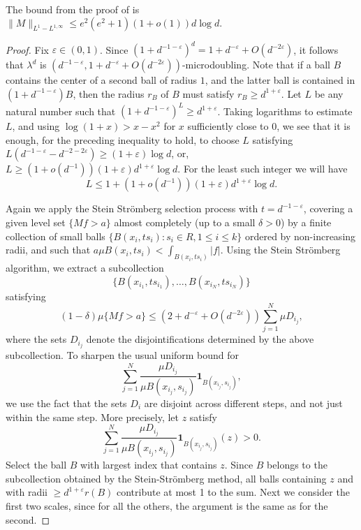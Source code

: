 \documentclass[12pt]{amsart}
\theoremstyle{definition}
\theoremstyle{parrafo}
\begin{document}
 The bound from the proof of \cite[Theorem 1]{StSt} is 
 $\|M\|_{L^1-L^{1,\infty}} \le  e^2 (e^2 + 1) (1 + o(1)) d \log d.$

 \begin{proof} Fix $\varepsilon \in (0,1)$.  Since $(1 + d^{-1 - \varepsilon})^d = 1 + d^{ - \varepsilon}
 + O(d^{ -2  \varepsilon})$, it follows that $\lambda^d$ is $(d^{-1  - \varepsilon},  1 + d^{ - \varepsilon}
 + O(d^{ -2  \varepsilon}))$-microdoubling. Note that if a ball $B$ contains the center of a second  ball of
 radius $1$, and the latter ball is contained in $(1 + d^{-1 - \varepsilon}) B$, then the radius $r_B$
 of $B$ must satisfy $r_B \ge  d^{ 1 +  \varepsilon}$. Let  $L$ be any natural number such that 
 $(1 + d^{-1 - \varepsilon})^L \ge  d^{1 +  \varepsilon}$. Taking logarithms
 to estimate $L$, 
 and using $\log(1 + x) > x - x^2$ for $x$ sufficiently close to $0$, we see that it is
 enough, for the preceding inequality to hold,  to choose $L$ satisfying $L (d^{-1 - \varepsilon} - d^{-2 - 2\varepsilon})
 \ge (1 + \varepsilon) \log d$, or, $L \ge (1 + o(d^{-1}))(1 + \varepsilon) d^{1 + \varepsilon} \log d$.  
For the least such integer we will have 
$$
L \le 1 + (1 + o(d^{-1}))(1 + \varepsilon) d^{1 + \varepsilon} \log d.
$$

 Again we  apply the
 Stein Str\"omberg selection process  with $t = d^{-1 - \varepsilon}$,  
  covering a given  level set  $\{M f > a\}$  almost completely (up to a small $\delta > 0$) by a finite collection of  small balls
 $\{B(x_i, t s_i): s_i \in R, 1 \le i \le k\}$  ordered by non-increasing radii,
 and such that $a \mu B(x_i, t s_i) < \int_{B(x_i, t s_i)} |f|$.
 Using the Stein Str\"omberg algorithm,  we extract a subcollection 
$$
\{B(x_{i_1}, t s_{i_1}), \dots, B(x_{i_N}, t s_{i_N})\}
$$
 satisfying 
\begin{equation} \label{SSsum1}
(1 - \delta) \mu \{M f > a\}
\le 
(2 + d^{ - \varepsilon}
 + O(d^{ -2  \varepsilon})) \sum_{j=1}^N \mu D_{i_j},
 \end{equation}
 where the sets $D_{i_j}$ denote the disjointifications determined by the above subcollection.
To sharpen the usual uniform bound for 
\begin{equation*}
\sum_{j=1}^N \frac{\mu D_{i_j}}{\mu B(x_{i_j}, s_{i_j})}\mathbf{1}_{B(x_{i_j}, s_{i_j})},
\end{equation*}
 we use the fact that the  sets $D_i$ are disjoint
across different steps, and not just within the same step. More precisely, 
let $z$ satisfy
\begin{equation} \label{SSsum}
 \sum_{j=1}^N \frac{\mu D_{i_j}}{\mu B(x_{i_j}, s_{i_j})}\mathbf{1}_{B(x_{i_j}, s_{i_j})}(z) > 0.
\end{equation}
Select the ball $B$   with largest index that contains $z$. Since $B$ belongs to the subcollection
obtained by the Stein-Str\"omberg method, all balls containing $z$ and  with radii
$\ge d^{ 1 +  \varepsilon} r(B)$  contribute at most 1 to the sum. 
Next  we consider the first two scales, since for all the others, the argument
is the same as for the second. 


\end{proof}
\end{document}
